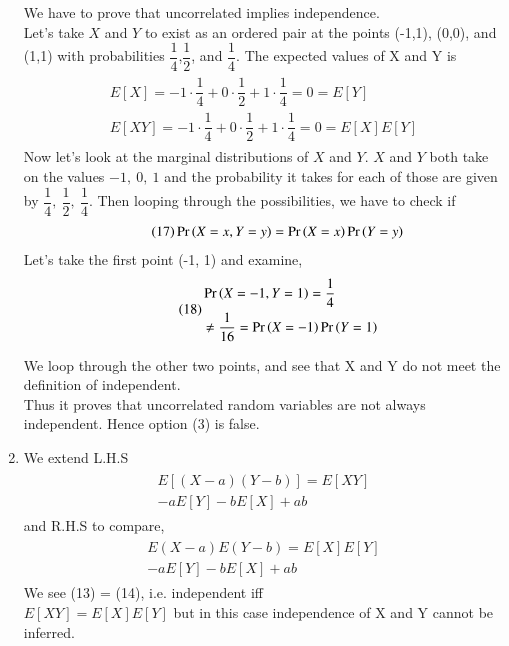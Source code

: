\documentclass[journal,12pt,twocolumn]{IEEEtran}
\begin{document}
\begin{enumerate}
We have to prove that uncorrelated implies independence.\\
Let’s take $X$ and $Y$ to exist as an ordered pair at the points (-1,1), (0,0), and (1,1) with probabilities $\dfrac{1}{4}$,$\dfrac{1}{2}$, and $\dfrac{1}{4}$. The expected values of X and Y is\\
\begin{align}\tag{16}
    \begin{split}
        E[X] = -1\cdot\dfrac{1}{4} + 0\cdot\dfrac{1}{2} + 1\cdot\dfrac{1}{4} = 0 = E[Y]\\
        E[XY] = -1\cdot\dfrac{1}{4} + 0\cdot\dfrac{1}{2} + 1\cdot\dfrac{1}{4} = 0 = E[X]E[Y]
    \end{split}
\end{align}
Now let's look at the marginal distributions of $X$ and $Y$. $X$ and $Y$ both take on the values $-1,\ 0,\ 1$ and the probability it takes for each of those are given by $\dfrac{1}{4},\ \dfrac{1}{2},\ \dfrac{1}{4}$. Then looping through the possibilities, we have to check if 
\begin{align}\tag{17}
  \Pr\left(X=x, Y=y\right) = \Pr\left(X=x\right)\Pr\left(Y=y\right)  
\end{align}
Let's take the first point (-1, 1) and examine,\\
\begin{align}\tag{18}
    \begin{split}
        &\Pr\left(X=-1, Y=1\right) = \dfrac{1}{4}\\ &\ne \dfrac{1}{16} = \Pr\left(X=-1\right)\Pr\left(Y=1\right)
    \end{split}
\end{align}

We loop through the other two points, and see that X and Y do not meet the definition of independent.\\
Thus it proves that uncorrelated random variables are not always independent. Hence option (3) is false.\\
    \item We extend L.H.S
\begin{align}\tag{19}
    \begin{split}
        E[(X-a)(Y-b)] = E[XY]\\ - aE[Y] - bE[X] + ab
    \end{split}
\end{align}
and R.H.S to compare,
\begin{align}\tag{20}
    \begin{split}
        E(X-a) E(Y-b) = E[X]E[Y]\\ - aE[Y] - bE[X] + ab
    \end{split}
\end{align}
We see (13) = (14), i.e. independent iff\\
$E[XY] = E[X] E[Y]$ but in this case independence of X and Y cannot be inferred.\\


\end{enumerate}
\end{document}
